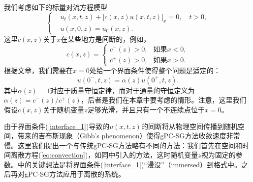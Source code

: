 我们考虑如下的标量对流方程模型
\begin{equation}\label{eq:convection}
  \left\{
  \begin{aligned}
    &u_t(x,t,z) + \big[c(x,z)u(x,t,z)\big]_x = 0,\quad t>0, \\
    &u(x, 0, z) = u_0(x, z).
  \end{aligned}
  \right.
\end{equation}
这里$c(x, z)$关于$x$在某些地方是间断的，例如，
\begin{equation}
  c(x, z) = 
  \begin{cases}
    c^-(z)>0, & \text{如果$x<0$}, \\
    c^+(z)>0, & \text{如果$x>0$}.
  \end{cases}
\end{equation}
根据文章，我们需要在$x = 0$处给一个界面条件使得整个问题是适定的：
\begin{equation}\label{interface_1}
  u(0^-,t, z) = \alpha(z)u(0^+,t,z).
\end{equation}
其中$\alpha(z) = 1$对应于质量守恒定律，而对于通量的守恒定义为$\alpha(z) = c^-(z) / c^+(z)$，后者是我们在本章中要考虑的情形。注意，这里我们假设$c(x,z)$关于随机变量$z$足够光滑，并且只有一个不连续点位于$x = 0$。

由于界面条件(\ref{interface_1})导致的$u(x,t,z)$的间断将从物理空间传播到随机空间，带来的吉布斯现象（Gibb's phenomenon）使得gPC-SG方法收敛速度非常慢。这里我们提出一个与传统gPC-SG方法略有不同的方法：我们首先在空间和时间离散方程(\ref{eq:convection})，如同中引入的方法，这时随机变量$z$视为固定的参数。中的关键想法是将界面条件(\ref{interface_1})“浸没”（immersed）到格式中。之后再对gPC-SG方法应用于离散的系统。


